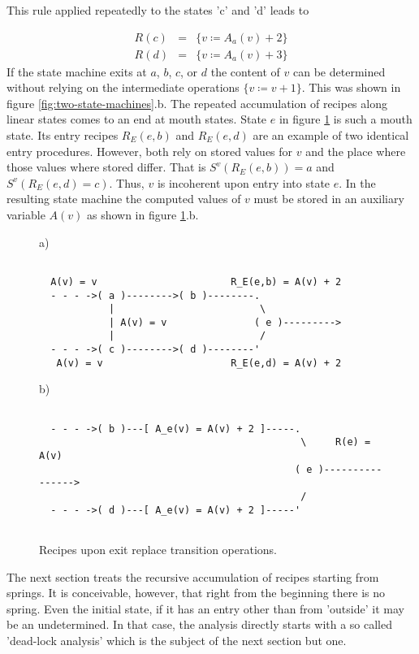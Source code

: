 \documentclass[12pt,a4paper]{scrartcl}
\begin{document}
This rule applied repeatedly to the states 'c' and 'd' leads to

\begin{eqnarray}
    R(c) &=&\{ v \coloneqq  A_a(v) + 2 \} \\
    R(d) &=&\{ v \coloneqq  A_a(v) + 3 \}                                 
\end{eqnarray}
If the state machine exits at $a$, $b$, $c$, or $d$ the content of $v$ can be
determined without relying on the intermediate operations $\{ v\coloneqq v+1 \}$. This
was shown in figure \ref{fig:two-state-machines}.b. 
The repeated accumulation of recipes along linear states comes to an end at
mouth states. State $e$ in figure \ref{fig:interference-example} is such a
mouth state. Its entry recipes $R_E(e,b)$ and $R_E(e,d)$ are an example of two
identical entry procedures. However, both rely on stored values for $v$ and the
place where those values where stored differ. That is $S^v(R_E(e,b))=a$ and
$S^v(R_E(e,d)=c)$. Thus, $v$ is incoherent upon entry into state $e$.  In
the resulting state machine the computed values of $v$ must be stored in an
auxiliary variable $A(v)$ as shown in figure \ref{fig:interference-example}.b.
\begin{figure}[htbp] \leavevmode \label{fig:interference-example}
a)
\begin{verbatim}

  A(v) = v                       R_E(e,b) = A(v) + 2
  - - - ->( a )-------->( b )--------.
            |                         \
            | A(v) = v               ( e )--------->
            |                         /
  - - - ->( c )-------->( d )--------'
   A(v) = v                      R_E(e,d) = A(v) + 2

\end{verbatim}
b)
\begin{verbatim}
                                 
  - - - ->( b )---[ A_e(v) = A(v) + 2 ]-----.
                                             \     R(e) = A(v)
                                            ( e )---------------->
                                             /
  - - - ->( d )---[ A_e(v) = A(v) + 2 ]-----'
                                 

\end{verbatim}
\caption{Recipes upon exit replace transition operations.}
\end{figure}

The next section treats the recursive accumulation of recipes starting from
springs.  It is conceivable, however, that right from the beginning there is no
spring.  Even the initial state, if it has an entry other than from 'outside'
it may be an undetermined.  In that case, the analysis directly starts with a
so called 'dead-lock analysis' which is the subject of the next section but
one.
\end{document}
